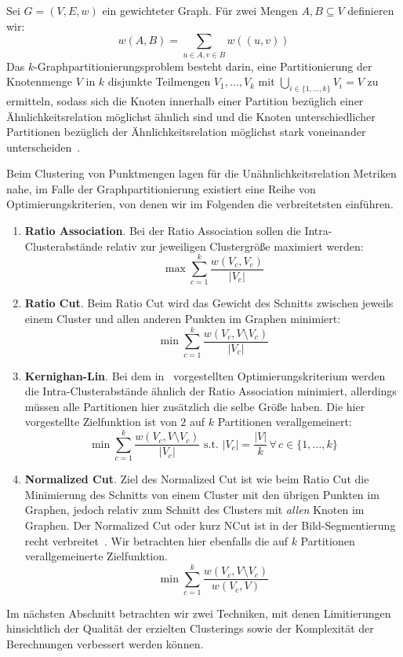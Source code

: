 \begin{definition}[$k$-Graphpartitionierung]
\label{def:graphpartitioning}
	Sei $G=(V,E,w)$ ein gewichteter Graph. Für zwei Mengen $A, B \subseteq V$ definieren wir:
	\[ w(A,B) = \sum_{u \in A, v \in B} w((u,v)) \]
	Das $k$-Graphpartitionierungsproblem besteht darin, eine Partitionierung der Knotenmenge $V$ in $k$ disjunkte Teilmengen
	$V_1, \dots, V_k$ mit $\bigcup_{i \in \{1, \dots, k \}} V_i = V$ zu ermitteln, sodass sich die Knoten innerhalb einer
	Partition bezüglich einer Ähnlichkeitsrelation möglichst ähnlich sind und die Knoten unterschiedlicher Partitionen
	bezüglich der Ähnlichkeitsrelation möglichst stark voneinander unterscheiden~\cite{KernighanL70}.
	
	Beim Clustering von Punktmengen lagen für die Unähnlichkeitsrelation Metriken nahe, im Falle der Graphpartitionierung
	existiert eine Reihe von Optimierungskriterien, von denen wir im Folgenden die verbreitetsten einführen.
	
	\begin{enumerate}
		\item 	\textbf{Ratio Association}. Bei der Ratio Association sollen die Intra-Clusterabstände relativ zur jeweiligen
				Clustergröße maximiert werden:
				\[ \max \sum_{c=1}^{k} \frac{w(V_c, V_c)}{\left|V_c\right|} \]
		\item 	\textbf{Ratio Cut}. Beim Ratio Cut wird das Gewicht des Schnitts zwischen jeweils einem Cluster und allen
				anderen Punkten im Graphen minimiert:
				\[ \min \sum_{c=1}^{k} \frac{w(V_c, V \setminus V_c)}{\left|V_c\right|} \]
		\item 	\textbf{Kernighan-Lin}. Bei dem in~\cite{KernighanL70} vorgestellten Optimierungskriterium werden die
				Intra-Clusterabstände ähnlich der Ratio Association minimiert, allerdings müssen alle Partitionen hier zusätzlich
				die selbe Größe haben. Die hier vorgestellte Zielfunktion ist von $2$ auf $k$ Partitionen verallgemeinert:
				\[ \min \sum_{c=1}^{k} \frac{w(V_c, V \setminus V_c)}{\left|V_c\right|} \textrm{ s.t. } 
				   \left|V_c\right| = \frac{\left|V\right|}{k} \, \forall \, c \in \{ 1, \dots, k \} \]
		\item 	\textbf{Normalized Cut}. Ziel des Normalized Cut ist wie beim Ratio Cut die Minimierung des Schnitts von einem
				Cluster mit den übrigen Punkten im Graphen, jedoch relativ zum Schnitt des Clusters mit \emph{allen}
				Knoten im Graphen. Der Normalized Cut oder kurz NCut ist in der Bild-Segmentierung recht verbreitet~\cite{ShiM00}.
				Wir betrachten hier ebenfalls die auf $k$ Partitionen verallgemeinerte Zielfunktion.
				\[ \min \sum_{c=1}^{k} \frac{w(V_c, V \setminus V_c)}{w(V_c, V)} \]
	\end{enumerate}
\end{definition}
Im nächsten Abschnitt betrachten wir zwei Techniken, mit denen Limitierungen hinsichtlich der Qualität der erzielten Clusterings
sowie der Komplexität der Berechnungen verbessert werden können.

